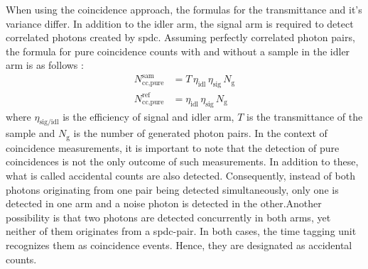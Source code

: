 \begin{comment}
	\begin{equation}
		\begin{aligned}
			\operatorname{Var}(T) 
			= \left( \frac{1}{\eta_{\text{idl}}\,N_g} \right)^{2}
			\Bigg[
			\operatorname{Var}\!\left(N_{\text{tot}}^{\text{sam}}\right) 
			+ \operatorname{Var}\!\left(N_{\text{noise}}^{\text{sam}}\right) 
			+ T^{2} \Big( 
			\operatorname{Var}\!\left(N_{\text{tot}}^{\text{ref}}\right) 
			+ \operatorname{Var}\!\left(N_{\text{noise}}^{\text{ref}}\right) 
			\Big)
			\Bigg]
			\operatorname{Var}(T) 
			&= \frac{1}{\big( N_{\text{tot}}^{\text{ref}} - N_{\text{noise}}^{\text{ref}} \big)^{2}}
			\Big[ \operatorname{Var}\!\left( N_{\text{tot}}^{\text{sam}} \right)
			+ \operatorname{Var}\!\left( N_{\text{noise}}^{\text{sam}} \right) \Big] \\[0.75em]
			&\quad + \frac{\big( N_{\text{tot}}^{\text{sam}} - N_{\text{noise}}^{\text{sam}} \big)^{2}}
			{\big( N_{\text{tot}}^{\text{ref}} - N_{\text{noise}}^{\text{ref}} \big)^{4}}
			\Big[ \operatorname{Var}\!\left( N_{\text{tot}}^{\text{ref}} \right)
			+ \operatorname{Var}\!\left( N_{\text{noise}}^{\text{ref}} \right) \Big]
		\end{aligned}
		\label{eq:VarianceTransExpl}
	\end{equation}
\end{comment}
When using the coincidence approach, the formulas for the transmittance and it's variance differ. In addition to the idler arm, the signal arm is required to detect correlated photons created by \acrshort{spdc}. Assuming perfectly correlated photon pairs, the formula for pure coincidence counts with and without a sample in the idler arm is as follows \cite{hayatTheoryPhotonCoincidence1999}:
\begin{equation}
	\begin{aligned}
		N_{\text{cc,pure}}^{\text{sam}} &= T \,\eta_{\text{idl}} \,\eta_{\text{sig}} \, N_{\mathrm{g}} \\[0.5em]
		N_{\text{cc,pure}}^{\text{ref}} &= \eta_{\text{idl}} \,\eta_{\text{sig}} \, N_{\mathrm{g}}
	\end{aligned}
	\label{eq:pureCoinc}
\end{equation}
where $\eta_{\text{sig/idl}}$ is the efficiency of signal and idler arm, $T$ is the transmittance of the sample and $N_{\mathrm{g}}$ is the number of generated photon pairs. \newline
In the context of coincidence measurements, it is important to note that the detection of pure coincidences is not the only outcome of such measurements. In addition to these, what is called accidental counts are also detected. Consequently, instead of both photons originating from one pair being detected simultaneously, only one is detected in one arm and a noise photon is detected in the other.Another possibility is that two photons are detected concurrently in both arms, yet neither of them originates from a \acrshort{spdc}-pair. In both cases, the time tagging unit recognizes them as coincidence events. Hence, they are designated as accidental counts. \newline
